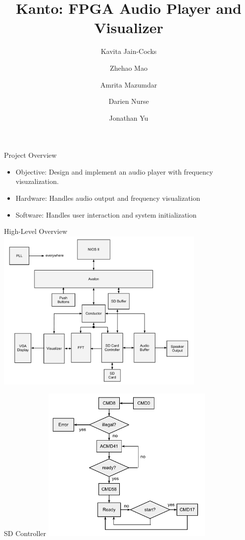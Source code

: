 \documentclass{beamer}
\title{Kanto: FPGA Audio Player and Visualizer}
\author{
  Kavita Jain-Cocks
  \and
  Zhehao Mao
  \and
  Amrita Mazumdar
  \and
  Darien Nurse
  \and
  Jonathan Yu}
\begin{document}
\begin{frame}
	\titlepage
\end{frame}

\begin{frame}{Project Overview}
	\begin{itemize}
		\item Objective: Design and implement an audio player with frequency visuzalization.
		\item Hardware: Handles audio output and frequency visualization
		\item Software: Handles user interaction and system initialization
	\end{itemize}
\end{frame}

\begin{frame}{High-Level Overview}
	\centering
	\includegraphics[width=4in]{top_level}
\end{frame}

\begin{frame}{SD Controller}
	\centering
	\includegraphics[height=3in]{sd-controller}
\end{frame}
\end{document}
